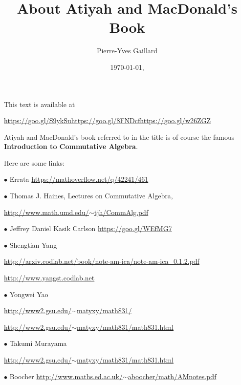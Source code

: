\documentclass[12pt]{article}
\title{About Atiyah and MacDonald's Book}
\author{Pierre-Yves Gaillard}
\date{\today,\currenttime}
\newcommand{\bu}{\bullet}
\begin{document}


\maketitle\tableofcontents

This text is available at 

\href{http://www.iecl.univ-lorraine.fr/~Pierre-Yves.Gaillard/DIVERS/Atiyah_MacDonald_c/}{https://goo.gl/S9ykSu}\quad\href{https://github.com/Pierre-Yves-Gaillard/Atiyah_MacDonald_c/blob/master/Atiyah_MacDonald_c.tex}{https://goo.gl/8FNDcf}\quad\href{https://docs.google.com/document/d/1AW4qMXoarPW1L1Nxbgy4bODorWEpE6_Gdd35sFJKyew/edit?usp=sharing}{https://goo.gl/w26ZGZ}

Atiyah and MacDonald's book referred to in the title is of course the famous \textbf{Introduction to Commutative Algebra}.

Here are some links:

$\bu$ Errata \href{https://mathoverflow.net/q/42241/461}{https://mathoverflow.net/q/42241/461}

$\bu$ Thomas J. Haines, Lectures on Commutative Algebra, 

\href{http://www.math.umd.edu/~tjh/CommAlg.pdf}{http://www.math.umd.edu/$\sim$tjh/CommAlg.pdf}

$\bu$ Jeffrey Daniel Kasik Carlson \href{https://goo.gl/WEfMG7}{https://goo.gl/WEfMG7}

$\bu$ Shengtian Yang 

\href{http://arxiv.codlab.net/book/note-am-ica/note-am-ica_0.1.2.pdf}{\small http://arxiv.codlab.net/book/note-am-ica/note-am-ica\_0.1.2.pdf}

\href{http://www.yangst.codlab.net}{http://www.yangst.codlab.net}

$\bu$ Yongwei Yao

\href{http://www2.gsu.edu/~matyxy/math831/}{http://www2.gsu.edu/$\sim$matyxy/math831/}

\href{http://www2.gsu.edu/~matyxy/math831/math831.html}{http://www2.gsu.edu/$\sim$matyxy/math831/math831.html}

$\bu$ Takumi Murayama 

\href{http://www2.gsu.edu/~matyxy/math831/math831.html}{http://www2.gsu.edu/$\sim$matyxy/math831/math831.html}

$\bu$ Boocher \href{http://www.maths.ed.ac.uk/~aboocher/math/AMnotes.pdf}{\small http://www.maths.ed.ac.uk/$\sim$aboocher/math/AMnotes.pdf}
\end{document}
